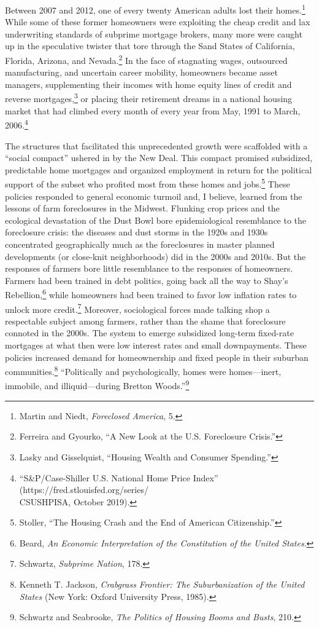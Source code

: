 \documentclass[12pt,oneside]{psthesis}
\begin{document}
Between 2007 and 2012, one of every twenty American adults lost their homes.\footnote{Martin and Niedt, \emph{Foreclosed America}, 5.}
While some of these former homeowners were exploiting the cheap credit and lax underwriting standards of subprime mortgage brokers, many more were caught up in the speculative twister that tore through the Sand States of California, Florida, Arizona, and Nevada.\footnote{Ferreira and Gyourko, ``A New Look at the U.S. Foreclosure Crisis.''}
In the face of stagnating wages, outsourced manufacturing, and uncertain career mobility, homeowners became asset managers, supplementing their incomes with home equity lines of credit and reverse mortgages,\footnote{Lasky and Gisselquist, ``Housing Wealth and Consumer Spending.''} or placing their retirement dreams in a national housing market that had climbed every month of every year from May, 1991 to March, 2006.\footnote{``S\&P/Case-Shiller U.S. National Home Price Index'' (https://fred.stlouisfed.org/series/\\CSUSHPISA, October 2019).}

The structures that facilitated this unprecedented growth were scaffolded with a ``social compact'' ushered in by the New Deal.
This compact promised subsidized, predictable home mortgages and organized employment in return for the political support of the subset who profited most from these homes and jobs.\footnote{Stoller, ``The Housing Crash and the End of American Citizenship.''}
These policies responded to general economic turmoil and, I believe, learned from the lessons of farm foreclosures in the Midwest.
Flunking crop prices and the ecological devastation of the Dust Bowl bore epidemiological resemblance to the foreclosure crisis: the diseases and dust storms in the 1920s and 1930s concentrated geographically much as the foreclosures in master planned developments (or close-knit neighborhoods) did in the 2000s and 2010s.
But the responses of farmers bore little resemblance to the responses of homeowners.
Farmers had been trained in debt politics, going back all the way to Shay's Rebellion,\footnote{Beard, \emph{An Economic Interpretation of the Constitution of the United States}.} while homeowners had been trained to favor low inflation rates to unlock more credit.\footnote{Schwartz, \emph{Subprime Nation}, 178.}
Moreover, sociological forces made talking shop a respectable subject among farmers, rather than the shame that foreclosure connoted in the 2000s.
The system to emerge subsidized long-term fixed-rate mortgages at what then were low interest rates and small downpayments.
These policies increased demand for homeownership and fixed people in their suburban communities.\footnote{Kenneth T. Jackson, \emph{Crabgrass Frontier: The Suburbanization of the United States} (New York: Oxford University Press, 1985).}
``Politically and psychologically, homes were homes---inert, immobile, and illiquid---during Bretton Woods.''\footnote{Schwartz and Seabrooke, \emph{The Politics of Housing Booms and Busts}, 210.}
\end{document}
